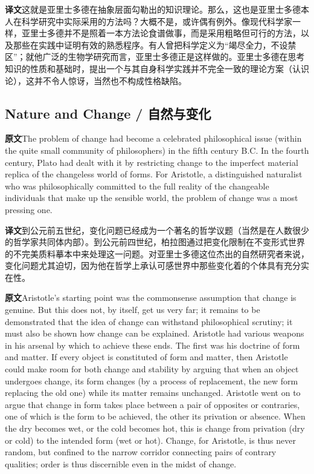 \documentclass[UTF8,zihao=-4]{ctexart}
\newcommand{\BodyFont}{\fontsize{10.5pt}{15.5pt}\selectfont}
\newcommand{\origlabel}{\textbf{原文}\quad}
\newcommand{\translabel}{\textbf{译文}\quad}
\newcommand{\orig}{\par\noindent\begingroup\BodyFont\origlabel}
\newcommand{\zhline}[1]{\par\endgroup\noindent\begingroup\BodyFont\translabel #1\par\endgroup\vspace{0.35em}}
\begin{document}
\zhline{这就是亚里士多德在抽象层面勾勒出的知识理论。那么，这也是亚里士多德本人在科学研究中实际采用的方法吗？大概不是，或许偶有例外。像现代科学家一样，亚里士多德并不是照着一本方法论食谱做事，而是采用粗略但可行的方法，以及那些在实践中证明有效的熟悉程序。有人曾把科学定义为“竭尽全力，不设禁区”；就他广泛的生物学研究而言，亚里士多德正是这样做的。亚里士多德在思考知识的性质和基础时，提出一个与其自身科学实践并不完全一致的理论方案（认识论），这并不令人惊讶，当然也不构成性格缺陷。}

\subsection*{Nature and Change / 自然与变化}

\orig The problem of change had become a celebrated philosophical issue (within the quite small community of philosophers) in the fifth century B.C. In the fourth century, Plato had dealt with it by restricting change to the imperfect material replica of the changeless world of forms. For Aristotle, a distinguished naturalist who was philosophically committed to the full reality of the changeable individuals that make up the sensible world, the problem of change was a most pressing one.

\zhline{到公元前五世纪，变化问题已经成为一个著名的哲学议题（当然是在人数很少的哲学家共同体内部）。到公元前四世纪，柏拉图通过把变化限制在不变形式世界的不完美质料摹本中来处理这一问题。对亚里士多德这位杰出的自然研究者来说，变化问题尤其迫切，因为他在哲学上承认可感世界中那些变化着的个体具有充分实在性。}

\orig Aristotle's starting point was the commonsense assumption that change is genuine. But this does not, by itself, get us very far; it remains to be demonstrated that the idea of change can withstand philosophical scrutiny; it must also be shown how change can be explained. Aristotle had various weapons in his arsenal by which to achieve these ends. The first was his doctrine of form and matter. If every object is constituted of form and matter, then Aristotle could make room for both change and stability by arguing that when an object undergoes change, its form changes (by a process of replacement, the new form replacing the old one) while its matter remains unchanged. Aristotle went on to argue that change in form takes place between a pair of opposites or contraries, one of which is the form to be achieved, the other its privation or absence. When the dry becomes wet, or the cold becomes hot, this is change from privation (dry or cold) to the intended form (wet or hot). Change, for Aristotle, is thus never random, but confined to the narrow corridor connecting pairs of contrary qualities; order is thus discernible even in the midst of change.
\end{document}
